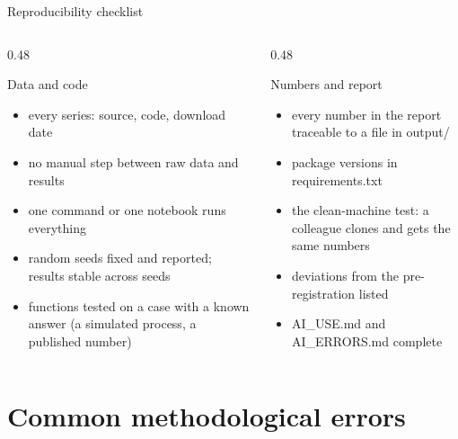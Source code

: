 \begin{frame}{Reproducibility checklist}
\itemsize{\small}
\begin{columns}[T]
\begin{column}{0.48\textwidth}
\begin{block}{Data and code}
\begin{itemize}
    \item every series: source, code, download date
    \item no manual step between raw data and results
    \item one command or one notebook runs everything
    \item random seeds fixed and reported; results stable across seeds
    \item functions tested on a case with a known answer (a simulated process, a published number)
\end{itemize}
\end{block}
\end{column}
\begin{column}{0.48\textwidth}
\begin{block}{Numbers and report}
\begin{itemize}
    \item every number in the report traceable to a file in output/
    \item package versions in requirements.txt
    \item the clean-machine test: a colleague clones and gets the same numbers 
    \item deviations from the pre-registration listed
    \item AI\_USE.md and AI\_ERRORS.md complete
\end{itemize}
\end{block}
\end{column}
\end{columns}
\end{frame}


\section{Common methodological errors}

